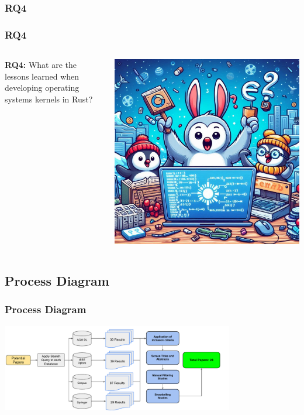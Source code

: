 \documentclass{beamer}
\begin{document}
\subsubsection{RQ4}
\begin{frame}
  \frametitle{RQ4}
  \begin{columns}
    \begin{column}{0.5\textwidth}
      \textbf{RQ4:} What are the lessons learned when developing operating systems kernels in Rust?
      \end{column}
    \begin{column}{0.5\textwidth}
      \includegraphics[width=.8\textwidth]{images/rq4.jpeg}
    \end{column}
  \end{columns}
\end{frame}

\subsection{Process Diagram}
\begin{frame}
  \frametitle{Process Diagram}
  \includegraphics[width=4in]{figures/process-diagram.pdf}
\end{frame}
\end{document}
